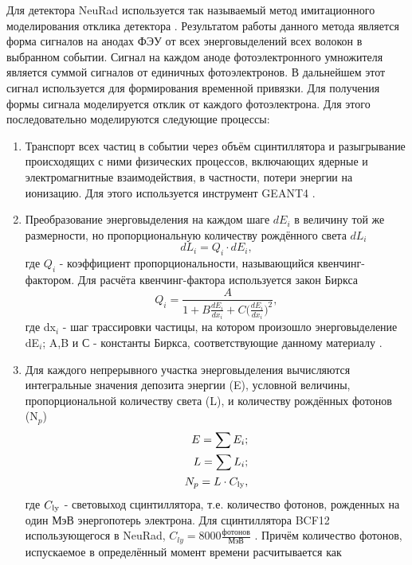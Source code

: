 Для детектора NeuRad используется так называемый метод имитационного моделирования отклика детектора \cite{vitalik}. 
Результатом работы данного метода является форма сигналов на анодах ФЭУ от всех энерговыделений всех волокон в выбранном событии. Сигнал на каждом аноде фотоэлектронного умножителя является суммой сигналов от единичных фотоэлектронов. В дальнейшем этот сигнал используется для формирования временной привязки. Для получения формы сигнала моделируется отклик от каждого фотоэлектрона. Для этого последовательно моделируются следующие процессы:
\begin{enumerate}
	\item Транспорт всех частиц в событии через объём сцинтиллятора и разыгрывание происходящих с ними физических процессов, включающих ядерные и электромагнитные взаимодействия, в частности, потери энергии на ионизацию. Для этого используется инструмент GEANT4 \cite{geant}.
	\item Преобразование энерговыделения на каждом шаге $dE_i$ в величину той же размерности, но пропорциональную количеству рождённого света $dL_i$
	\begin{equation}
	\label{eq:lyield}
	dL_i = Q_i\cdot dE_i,
	\end{equation}
	где $Q_i$ - коэффициент пропорциональности, называющийся квенчинг-фактором. 
	Для расчёта квенчинг-фактора используется закон Биркса
	\begin{equation}
	\label{eq:quenching}
	Q_i = \frac{A}{1+B\frac{dE_i}{dx_i}+C\big(\frac{dE_i}{dx_i}\big)^2},
	\end{equation}
	где dx$_i$ - шаг трассировки частицы, на котором произошло энерговыделение dE$_i$; A,B и С - константы Биркса, соответствующие данному материалу \cite{vratislav}.
	\item Для каждого непрерывного участка энерговыделения вычисляются интегральные значения депозита энергии (E), условной величины, пропорциональной количеству света (L), и количеству рождённых фотонов (N$_p$)
	\begin{eqnarray}
	E=\sum E_i;\nonumber \\
	L=\sum L_i;\\
	N_p=L\cdot C_{\rm ly},\nonumber 
	\end{eqnarray}
	где $C_{\rm ly}$ - световыход сцинтиллятора, т.е. количество фотонов, рожденных на один МэВ энергопотерь электрона. Для сцинтиллятора BCF12 использующегося в NeuRad, $C_{ly} = 8000\frac{фотонов}{МэВ}$ \cite{crystals}.
	Причём количество фотонов, испускаемое в определённый момент времени расчитывается как

\end{enumerate}
